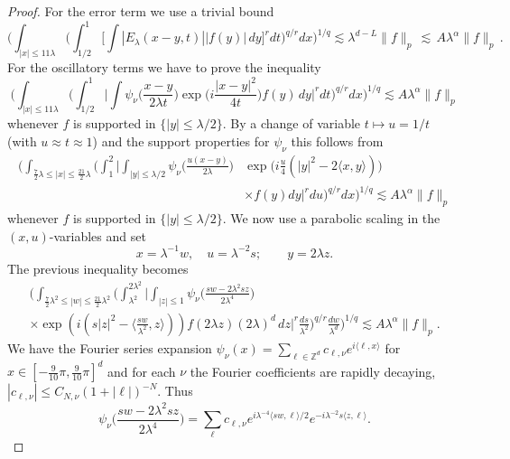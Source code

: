 \documentclass[11pt]{amsart}
\theoremstyle{definition}
\numberwithin{theorem}{section}
\numberwithin{definition}{section}
\numberwithin{equation}{section}
\def\inn#1#2{\langle#1,#2\rangle}
\newcommand{\Be}{\begin{equation}}
\newcommand{\Ee}{\end{equation}}
\renewcommand{\le}{\leqslant}
\def\inn#1#2{\langle#1,#2\rangle}
\def\lc{\lesssim}
\def\la{\lambda}             \def\La{\Lambda}
\def\bbZ{{\mathbb {Z}}}
\renewcommand{\le}{\leqslant}
\begin{document}
\begin{proof}[Proof]
For the error term we use a trivial bound
$$\Big(\int_{|x|\le 11 \la} \Big(\int_{1/2}^1
\Big[\int |E_\la(x-y,t)| |f(y)| \,dy\Big]^rdt\Big)^{q/r}dx\Big)^{1/q} \lc
 \la^{d-L} \|f\|_p\,\lc\, A\la^\alpha \|f\|_p\,.
$$ For the oscillatory terms we have to  prove the inequality
\Be\label{lplp3}\Big( \int_{|x|\le 11 \la} \Big(\int_{1/2}^1
\Big|\int \psi_\nu \big(\frac{x-y}{2\la t}\big)
\exp\big(i\frac{|x-y|^2}{4t}\big) f(y) \,dy\Big|^rdt\Big)^{q/r}
dx\Big)^{1/q} \lc A \la^{\alpha}   \|f\|_p \Ee whenever $f$ is supported in
$\{|y|\le \la/2\}$. By a change of variable $t\mapsto u=1/t$ (with
$u\approx t\approx 1$) and the support properties for $\psi_\nu$
this  follows from
\begin{align}\label{lplp3b}\Big(\int_{\frac 72\la\le |x|\le \frac{21}{2} \la}\Big( \int_{1}^2
\Big|\int_{|y|\le \la/2} \psi_\nu\big(\frac{u(x-y)}{2\la}\big)
&\exp\big(i\frac u 4 (|y|^2-2\inn xy)\big)
\\&\times f(y) dy\Big|^{r}du\Big)^{q/r}dx \Big)^{1/q}
 \lc
A \la^{\alpha}   \|f\|_p \nonumber
\end{align}
whenever $f$ is supported in
$\{|y|\le \la/2\}$. We now use a parabolic
scaling in the $(x,u)$-variables  and set
$$x= \la^{-1}w,\quad u= \la^{-2} s;  \qquad y= 2\la z.$$
The
previous inequality becomes
\begin{multline}
\label{lplp3d}
\Big(\int_{\frac72\la^2\le |w|\le \frac{21}{2} \la^2} \Big(\int_{\la^2}^{2\la^2}
\Big|\int_{|z|\le 1} \psi_\nu\big(\frac{sw-2\la^2sz}{2\la^4}\big)
\\ \times\exp(i (s|z|^2-\inn {\frac{sw}{\la^2}}{z})) f(2\la z) (2\la)^d\,dz\Big|^r
\frac{ds} {\la^{2}}
\Big)^{q/r} \frac{dw}{\la^{d}}\Big)^{1/q}  \lc A \la^{\alpha}  \|f\|_p.
\end{multline}
We have the  Fourier series expansion
$\psi_\nu(x) =\sum_{\ell\in \bbZ^d} c_{\ell,\nu} e^{i\inn \ell x}$
for
$x\in [-\frac{9}{10}\pi,\frac 9{10}\pi]^d$ and for each $\nu$  the Fourier coefficients are rapidly decaying,
$|c_{\ell,\nu}|\le C_{N,\nu} (1+|\ell|)^{-N}$. Thus
$$
\psi_\nu\big(\frac{sw-2\la^2sz}{2\la^4}\big)
 =
\sum_\ell c_{\ell,\nu} e^{i\la^{-4}\inn {sw}\ell/2}
e^{-i \la^{-2} s\inn z\ell}.$$



\end{proof}
\end{document}
